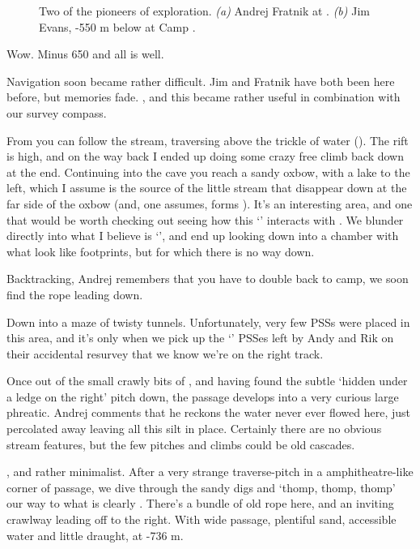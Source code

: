\begin{figure}[t]
\begin{subfigure}[t]{0.49\textwidth}
			\caption{}\label{jim x-ray}
		\end{subfigure}
		\caption{Two of the pioneers of  exploration.
  \textit{(a)} Andrej Fratnik at . 
  \textit{(b)} Jim Evans, -550 m below at Camp . }
	\end{figure}


Wow. Minus 650 and all is well.

Navigation soon became rather difficult. Jim and Fratnik have both been
here before, but memories fade. , and this became rather useful
in combination with our survey compass.

From  you can follow the stream,
traversing above the trickle of water (). The rift is high,
and on the way back I ended up doing some crazy free climb back down at
the end. Continuing into the cave you reach a sandy oxbow, with a lake
to the left, which I assume is the source of the little stream that
disappear down at the far side of the oxbow (and, one assumes, forms
). It's an interesting area, and one that would be worth
checking out seeing how this `' interacts with . We blunder directly into what I believe is `',
and end up looking down into a chamber with what look like footprints,
but for which there is no way down.

Backtracking, Andrej remembers that you have to double back to camp, we
soon find the rope leading down.

Down into a maze of twisty tunnels. Unfortunately, very few PSSs were
placed in this area, and it's only when we pick up the `' PSSes
left by Andy and Rik on their accidental resurvey that we know we're on
the right track.

Once out of the small crawly bits of , and having found the
subtle `hidden under a ledge on the right' pitch down, the passage
develops into a very curious large phreatic. Andrej comments that he
reckons the water never ever flowed here, just percolated away leaving
all this silt in place. Certainly there are no obvious stream features,
but the few pitches and climbs could be old cascades.

, and rather minimalist. After a very
strange traverse-pitch in a amphitheatre-like corner of passage, we dive
through the sandy digs and `thomp, thomp, thomp' our way to what is
clearly . There's a bundle of old rope here, and an
inviting crawlway leading off to the right. With wide passage, plentiful
sand, accessible water and little draught,  at -736 m.

